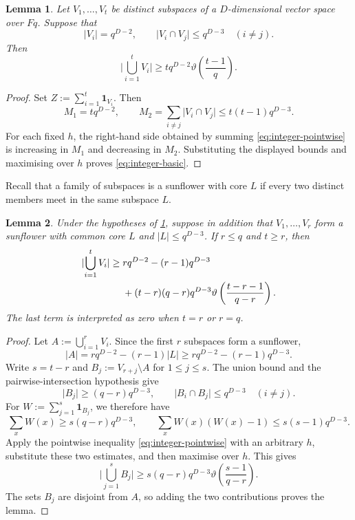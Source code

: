 \documentclass[11pt,reqno]{amsart}
\numberwithin{equation}{section}
\newtheorem{lemma}[lemma]{Lemma}
\theoremstyle{definition}
\theoremstyle{remark}
\newcommand{\Fq}{\mathbb F_q}
\newcommand{\one}{\mathbf 1}
\newcommand{\abs}[1]{\lvert#1\rvert}
\def\Fq{Fq}%
\def\mathbb#1{#1}%
\begin{document}
\begin{lemma}\label{lem:integer-basic}
Let $V_1,\ldots,V_t$ be distinct subspaces of a $D$-dimensional vector space over $\Fq$.  Suppose that
\[
 \abs{V_i}=q^{D-2},
 \qquad
 \abs{V_i\cap V_j}\le q^{D-3}
 \quad(i\ne j).
\]
Then
\begin{equation}\label{eq:integer-basic}
 \abs{\bigcup_{i=1}^tV_i}
 \ge
 tq^{D-2}\vartheta\left(\frac{t-1}{q}\right).
\end{equation}
\end{lemma}

\begin{proof}
Set $Z:=\sum_{i=1}^t\one_{V_i}$.  Then
\[
 M_1=tq^{D-2},
 \qquad
 M_2
 =\sum_{i\ne j}\abs{V_i\cap V_j}
 \le t(t-1)q^{D-3}.
\]
For each fixed $h$, the right-hand side obtained by summing
\eqref{eq:integer-pointwise} is increasing in $M_1$ and decreasing in $M_2$.  Substituting the displayed bounds and maximising over $h$ proves \eqref{eq:integer-basic}.
\end{proof}

Recall that a family of subspaces is a sunflower with core $L$ if every two distinct members meet in the same subspace $L$.

\begin{lemma}\label{lem:integer-sunflower}
Under the hypotheses of \cref{lem:integer-basic}, suppose in addition that
$V_1,\ldots,V_r$ form a sunflower with common core $L$ and
$\abs L\le q^{D-3}$.  If $r\le q$ and $t\ge r$, then
\begin{align}
 \abs{\bigcup_{i=1}^tV_i}
 \ge{}&rq^{D-2}-(r-1)q^{D-3}\notag\\
 &+(t-r)(q-r)q^{D-3}
 \vartheta\left(\frac{t-r-1}{q-r}\right).
 \label{eq:integer-sunflower}
\end{align}
The last term is interpreted as zero when $t=r$ or $r=q$.
\end{lemma}

\begin{proof}
Let $A:=\bigcup_{i=1}^rV_i$.  Since the first $r$ subspaces form a sunflower,
\[
 \abs A
 =rq^{D-2}-(r-1)\abs L
 \ge rq^{D-2}-(r-1)q^{D-3}.
\]
Write $s=t-r$ and
$B_j:=V_{r+j}\setminus A$ for $1\le j\le s$.  The union bound and the pairwise-intersection hypothesis give
\[
 \abs{B_j}\ge(q-r)q^{D-3},
 \qquad
 \abs{B_i\cap B_j}\le q^{D-3}\quad(i\ne j).
\]
For $W:=\sum_{j=1}^s\one_{B_j}$, we therefore have
\[
 \sum_xW(x)\ge s(q-r)q^{D-3},
 \qquad
 \sum_xW(x)(W(x)-1)\le s(s-1)q^{D-3}.
\]
Apply the pointwise inequality \eqref{eq:integer-pointwise} with an arbitrary $h$, substitute these two estimates, and then maximise over $h$.  This gives
\[
 \abs{\bigcup_{j=1}^sB_j}
 \ge
 s(q-r)q^{D-3}
 \vartheta\left(\frac{s-1}{q-r}\right).
\]
The sets $B_j$ are disjoint from $A$, so adding the two contributions proves the lemma.
\end{proof}
\end{document}
